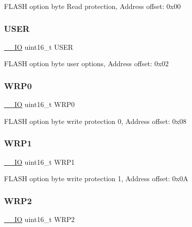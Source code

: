 F\+L\+A\+SH option byte Read protection, Address offset\+: 0x00 \mbox{\label{struct_o_b___type_def_a67442d4e459bba2c40fa62914d78ec1e}} 
\subsubsection{\texorpdfstring{U\+S\+ER}{USER}}
{\footnotesize\ttfamily \hyperlink{core__sc300_8h_aec43007d9998a0a0e01faede4133d6be}{\+\_\+\+\_\+\+IO} uint16\+\_\+t U\+S\+ER}

F\+L\+A\+SH option byte user options, Address offset\+: 0x02 \mbox{\label{struct_o_b___type_def_ad43c7a196f0eef88b3038383c4f7d903}} 
\subsubsection{\texorpdfstring{W\+R\+P0}{WRP0}}
{\footnotesize\ttfamily \hyperlink{core__sc300_8h_aec43007d9998a0a0e01faede4133d6be}{\+\_\+\+\_\+\+IO} uint16\+\_\+t W\+R\+P0}

F\+L\+A\+SH option byte write protection 0, Address offset\+: 0x08 \mbox{\label{struct_o_b___type_def_ac4e091dcb644dbb5d4a2c7aca7d4fe88}} 
\subsubsection{\texorpdfstring{W\+R\+P1}{WRP1}}
{\footnotesize\ttfamily \hyperlink{core__sc300_8h_aec43007d9998a0a0e01faede4133d6be}{\+\_\+\+\_\+\+IO} uint16\+\_\+t W\+R\+P1}

F\+L\+A\+SH option byte write protection 1, Address offset\+: 0x0A \mbox{\label{struct_o_b___type_def_a05486d021c6761bf5a04f410a1c24e06}} 
\subsubsection{\texorpdfstring{W\+R\+P2}{WRP2}}
{\footnotesize\ttfamily \hyperlink{core__sc300_8h_aec43007d9998a0a0e01faede4133d6be}{\+\_\+\+\_\+\+IO} uint16\+\_\+t W\+R\+P2}

